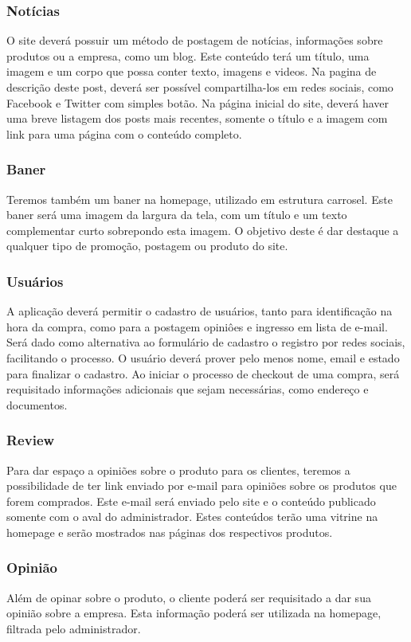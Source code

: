 \subsubsection{Notícias}
O site deverá possuir um método de postagem de notícias, informações sobre produtos ou a empresa, como um blog.
Este conteúdo terá um título, uma imagem e um corpo que possa conter texto, imagens e videos. Na pagina de descrição deste post, deverá ser possível compartilha-los em redes sociais, como Facebook e Twitter com simples botão. Na página inicial do site, deverá haver uma breve listagem dos posts mais recentes, somente o título e a imagem com link para uma página com o conteúdo completo.

\subsubsection{Baner}
Teremos também um baner na homepage, utilizado em estrutura carrosel. Este baner será uma imagem da largura da tela, com um título e um texto complementar curto sobrepondo esta imagem. O objetivo deste é dar destaque a qualquer tipo de promoção, postagem ou produto do site.

\subsubsection{Usuários}
A aplicação deverá permitir o cadastro de usuários, tanto para identificação na hora da compra, como para a postagem opiniôes e ingresso em lista de e-mail. Será dado como alternativa ao formulário de cadastro o registro por redes sociais, facilitando o processo. O usuário deverá prover pelo menos nome, email e estado para finalizar o cadastro. Ao iniciar o processo de checkout de uma compra, será requisitado informações adicionais que sejam necessárias, como endereço e documentos.

\subsubsection{Review}
Para dar espaço a opiniões sobre o produto para os clientes, teremos a possibilidade de ter link enviado por e-mail para opiniões sobre os produtos que forem comprados. Este e-mail será enviado pelo site e o conteúdo publicado somente com o aval do administrador. Estes conteúdos terão uma vitrine na homepage e serão mostrados nas páginas dos respectivos produtos.

\subsubsection{Opinião}
Além de opinar sobre o produto, o cliente poderá ser requisitado a dar sua opinião sobre a empresa. Esta informação poderá ser utilizada na homepage, filtrada pelo administrador.

